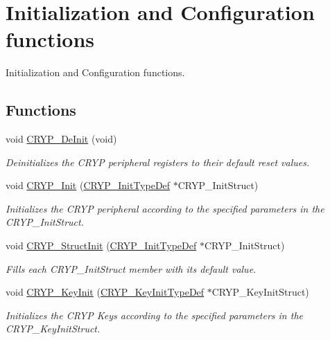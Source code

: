 \hypertarget{group___c_r_y_p___group1}{\section{Initialization and Configuration functions}
\label{group___c_r_y_p___group1}
}


Initialization and Configuration functions.  


\subsection*{Functions}
\begin{DoxyCompactItemize}
\item 
void \hyperlink{group___c_r_y_p___group1_gae19e54c9910b697e38f6c7577704ffae}{C\-R\-Y\-P\-\_\-\-De\-Init} (void)
\begin{DoxyCompactList}\small\item\em Deinitializes the C\-R\-Y\-P peripheral registers to their default reset values. \end{DoxyCompactList}\item 
void \hyperlink{group___c_r_y_p___group1_ga7b72c458d95581ab0a36be3e017fcf02}{C\-R\-Y\-P\-\_\-\-Init} (\hyperlink{struct_c_r_y_p___init_type_def}{C\-R\-Y\-P\-\_\-\-Init\-Type\-Def} $\ast$C\-R\-Y\-P\-\_\-\-Init\-Struct)
\begin{DoxyCompactList}\small\item\em Initializes the C\-R\-Y\-P peripheral according to the specified parameters in the C\-R\-Y\-P\-\_\-\-Init\-Struct. \end{DoxyCompactList}\item 
void \hyperlink{group___c_r_y_p___group1_ga8fb8ec75fe72d55046c8220825dfe41e}{C\-R\-Y\-P\-\_\-\-Struct\-Init} (\hyperlink{struct_c_r_y_p___init_type_def}{C\-R\-Y\-P\-\_\-\-Init\-Type\-Def} $\ast$C\-R\-Y\-P\-\_\-\-Init\-Struct)
\begin{DoxyCompactList}\small\item\em Fills each C\-R\-Y\-P\-\_\-\-Init\-Struct member with its default value. \end{DoxyCompactList}\item 
void \hyperlink{group___c_r_y_p___group1_gad4baa3865415215cae07c9fbfa131cb9}{C\-R\-Y\-P\-\_\-\-Key\-Init} (\hyperlink{struct_c_r_y_p___key_init_type_def}{C\-R\-Y\-P\-\_\-\-Key\-Init\-Type\-Def} $\ast$C\-R\-Y\-P\-\_\-\-Key\-Init\-Struct)
\begin{DoxyCompactList}\small\item\em Initializes the C\-R\-Y\-P Keys according to the specified parameters in the C\-R\-Y\-P\-\_\-\-Key\-Init\-Struct. \end{DoxyCompactList}\item 

\end{DoxyCompactItemize}
